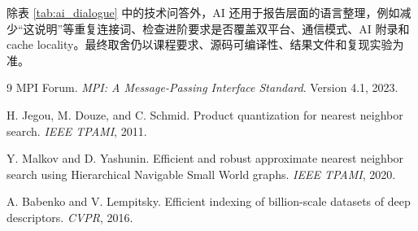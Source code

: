 \documentclass[a4paper,11pt,UTF8]{ctexart}
\begin{document}
除表 \ref{tab:ai_dialogue} 中的技术问答外，AI 还用于报告层面的语言整理，例如减少“这说明”等重复连接词、检查进阶要求是否覆盖双平台、通信模式、AI 附录和 cache locality。最终取舍仍以课程要求、源码可编译性、结果文件和复现实验为准。

\begin{thebibliography}{9}
MPI Forum. \textit{MPI: A Message-Passing Interface Standard}. Version 4.1, 2023.

H. Jegou, M. Douze, and C. Schmid. Product quantization for nearest neighbor search. \textit{IEEE TPAMI}, 2011.

Y. Malkov and D. Yashunin. Efficient and robust approximate nearest neighbor search using Hierarchical Navigable Small World graphs. \textit{IEEE TPAMI}, 2020.

A. Babenko and V. Lempitsky. Efficient indexing of billion-scale datasets of deep descriptors. \textit{CVPR}, 2016.
\end{thebibliography}
\end{document}
